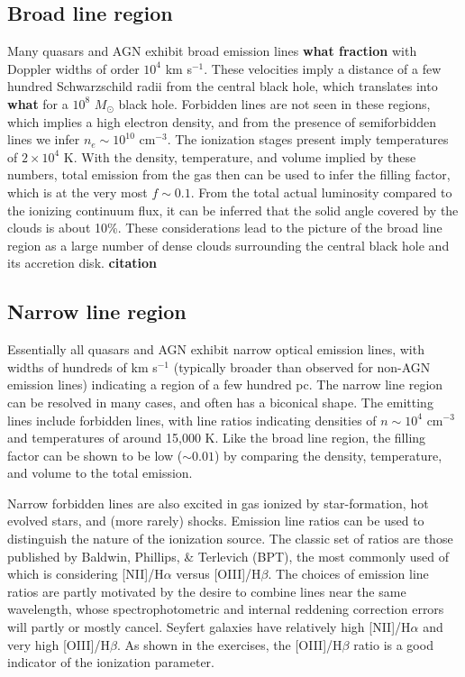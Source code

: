 \subsection{Broad line region}

Many quasars and AGN exhibit broad emission lines {\bf what fraction}
with Doppler widths of order $10^4$ km s$^{-1}$. These velocities
imply a distance of a few hundred Schwarzschild radii from the central
black hole, which translates into {\bf what} for a $10^8$ $M_\odot$
black hole. Forbidden lines are not seen in these regions, which
implies a high electron density, and from the presence of
semiforbidden lines we infer $n_e \sim 10^{10}$ cm$^{-3}$. The
ionization stages present imply temperatures of $2\times 10^4$ K. With
the density, temperature, and volume implied by these numbers, total
emission from the gas then can be used to infer the filling factor,
which is at the very most $f\sim 0.1$. From the total actual
luminosity compared to the ionizing continuum flux, it can be inferred
that the solid angle covered by the clouds is about 10\%. These
considerations lead to the picture of the broad line region as a large
number of dense clouds surrounding the central black hole and its
accretion disk. {\bf citation}

\subsection{Narrow line region}

Essentially all quasars and AGN exhibit narrow optical emission lines,
with widths of hundreds of km s$^{-1}$ (typically broader than
observed for non-AGN emission lines) indicating a region of a few
hundred pc. The narrow line region can be resolved in many cases, and
often has a biconical shape. The emitting lines include forbidden
lines, with line ratios indicating densities of $n\sim 10^4$ cm$^{-3}$
and temperatures of around 15,000 K. Like the broad line region, the
filling factor can be shown to be low ($\sim 0.01$) by comparing the
density, temperature, and volume to the total emission.

Narrow forbidden lines are also excited in gas ionized by
star-formation, hot evolved stars, and (more rarely) shocks. Emission
line ratios can be used to distinguish the nature of the ionization
source. The classic set of ratios are those published by Baldwin,
Phillips, \& Terlevich (BPT), the most commonly used of which is
considering [NII]/H$\alpha$ versus [OIII]/H$\beta$. The choices of
emission line ratios are partly motivated by the desire to combine
lines near the same wavelength, whose spectrophotometric and internal
reddening correction errors will partly or mostly cancel. Seyfert
galaxies have relatively high [NII]/H$\alpha$ and very high
[OIII]/H$\beta$. As shown in the exercises, the [OIII]/H$\beta$ ratio
is a good indicator of the ionization parameter.

